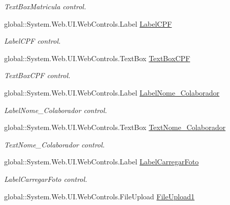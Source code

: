 \begin{DoxyCompactItemize}
\begin{DoxyCompactList}\small\item\em TextBoxMatricula control. \item\end{DoxyCompactList}\item 
global::System.Web.UI.WebControls.Label \hyperlink{class_sistema_r_h_1_1_alterar_colaborador_abcbafce8d7c3ee6138fa7a57c63c9008}{LabelCPF}
\begin{DoxyCompactList}\small\item\em LabelCPF control. \item\end{DoxyCompactList}\item 
global::System.Web.UI.WebControls.TextBox \hyperlink{class_sistema_r_h_1_1_alterar_colaborador_a2f6706d665a7891801462c566c15b202}{TextBoxCPF}
\begin{DoxyCompactList}\small\item\em TextBoxCPF control. \item\end{DoxyCompactList}\item 
global::System.Web.UI.WebControls.Label \hyperlink{class_sistema_r_h_1_1_alterar_colaborador_a8c051c87f104893658f0c2748dafbe1a}{LabelNome\_\-Colaborador}
\begin{DoxyCompactList}\small\item\em LabelNome\_\-Colaborador control. \item\end{DoxyCompactList}\item 
global::System.Web.UI.WebControls.TextBox \hyperlink{class_sistema_r_h_1_1_alterar_colaborador_ac2661901be83a1a4b14672993e91b0c1}{TextNome\_\-Colaborador}
\begin{DoxyCompactList}\small\item\em TextNome\_\-Colaborador control. \item\end{DoxyCompactList}\item 
global::System.Web.UI.WebControls.Label \hyperlink{class_sistema_r_h_1_1_alterar_colaborador_a1c451f73bd69a8fcdbfd09055fac70c7}{LabelCarregarFoto}
\begin{DoxyCompactList}\small\item\em LabelCarregarFoto control. \item\end{DoxyCompactList}\item 
global::System.Web.UI.WebControls.FileUpload \hyperlink{class_sistema_r_h_1_1_alterar_colaborador_af832da780e06ca16234e93b76f0d6df3}{FileUpload1}

\end{DoxyCompactItemize}

